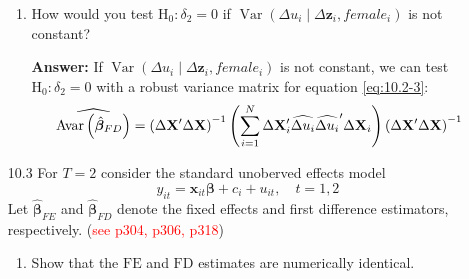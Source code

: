 \begin{enumerate}
\begin{enumerate}
        \item How would you test $\mathrm{H}_{0}: \delta_{2}=0$ if $\operatorname{Var}\left(\Delta u_{i} \mid \Delta \mathbf{z}_{i}, female_{i}\right)$ is not constant?
        
        \textbf{Answer:} If $\operatorname{Var}\left(\Delta u_{i} \mid \Delta \mathbf{z}_{i}, female_{i}\right)$ is not constant, we can test $\mathrm{H}_0: \delta_2 = 0$ with a robust variance matrix for equation \eqref{eq:10.2-3}:
        \[ \widehat{\mathrm{Avar}\left(\hat{\boldsymbol{\beta}}_{F D}\right)}=\left(\Delta \mathbf{X}^{\prime} \Delta \mathbf{X}\right)^{-1}\left(\sum_{i=1}^{N} \Delta \mathbf{X}_{i}^{\prime} \widehat{\Delta u_i} \widehat{\Delta u_i}^{\prime} \Delta \mathbf{X}_{i}\right)\left(\Delta \mathbf{X}^{\prime} \Delta \mathbf{X}\right)^{-1} \]
    \end{enumerate}
    
    
    \item[10.3] For $T=2$ consider the standard unoberved effects model
    \[ y_{i t}=\mathbf{x}_{i t} \boldsymbol{\beta}+c_{i}+u_{i t}, \quad t=1,2 \]
    Let $\hat{\boldsymbol{\beta}}_{F E}$ and $\hat{\boldsymbol{\beta}}_{F D}$ denote the fixed effects and first difference estimators, respectively. (\textcolor{red}{see p304, p306, p318})
    
    \begin{enumerate}
        \item Show that the $\mathrm{FE}$ and $\mathrm{FD}$ estimates are numerically identical.
        

\end{enumerate}
\end{enumerate}
